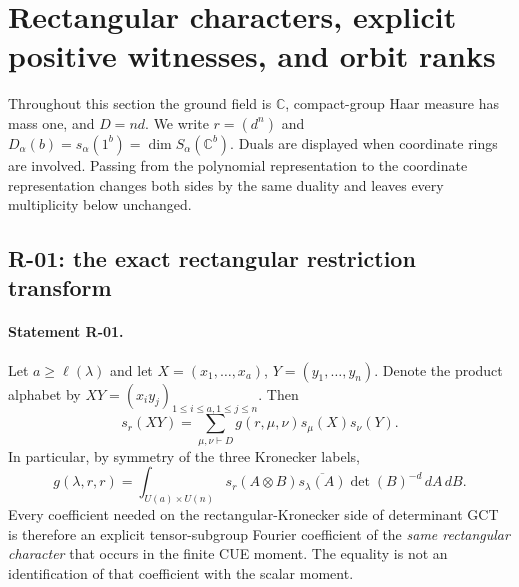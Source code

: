 
\section{Rectangular characters, explicit positive witnesses, and orbit ranks}

Throughout this section the ground field is $\mathbb C$, compact-group Haar
measure has mass one, and $D=nd$. We write $r=(d^n)$ and
$D_\alpha(b)=s_\alpha(1^b)=\dim S_\alpha(\mathbb C^b)$.
Duals are displayed when coordinate rings are involved. Passing from the
polynomial representation to the coordinate representation changes both sides
by the same duality and leaves every multiplicity below unchanged.

\subsection{R-01: the exact rectangular restriction transform}

\paragraph{Statement R-01.}
Let $a\geq\ell(\lambda)$ and let $X=(x_1,\ldots,x_a)$,
$Y=(y_1,\ldots,y_n)$. Denote the product alphabet by
$XY=(x_i y_j)_{1\leq i\leq a,1\leq j\leq n}$. Then
\begin{equation}\label{R01:branching}
 s_r(XY)=\sum_{\mu,\nu\vdash D}
 g(r,\mu,\nu)s_\mu(X)s_\nu(Y).
\end{equation}
In particular, by symmetry of the three Kronecker labels,
\begin{equation}\label{R01:haar}
 g(\lambda,r,r)=\int_{U(a)\times U(n)}
 s_r(A\otimes B)\overline{s_\lambda(A)}\det(B)^{-d}\,dA\,dB.
\end{equation}
Every coefficient needed on the rectangular-Kronecker side of determinant
GCT is therefore an explicit tensor-subgroup Fourier coefficient of the
\emph{same rectangular character} that occurs in the finite CUE moment.
The equality is not an identification of that coefficient with the scalar
moment.

